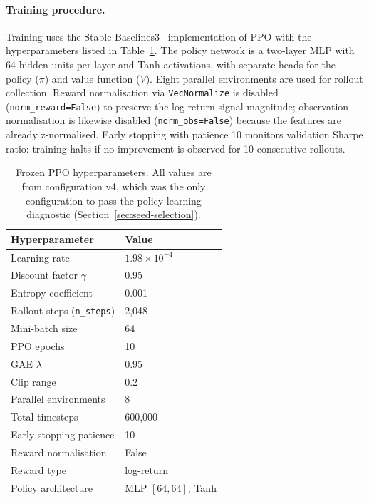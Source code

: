 \paragraph{Training procedure.}
Training uses the Stable-Baselines3~\cite{raffin2021stable}
implementation of PPO with the hyperparameters listed in
Table~\ref{tab:ppo-hyperparams}. The policy network is a two-layer MLP
with 64 hidden units per layer and Tanh activations, with separate heads
for the policy ($\pi$) and value function ($V$). Eight parallel
environments are used for rollout collection. Reward normalisation via
\texttt{VecNormalize} is disabled (\texttt{norm\_reward=False}) to
preserve the log-return signal magnitude; observation normalisation is
likewise disabled (\texttt{norm\_obs=False}) because the features are
already z-normalised. Early stopping with patience 10 monitors validation
Sharpe ratio: training halts if no improvement is observed for 10
consecutive rollouts.

\begin{table}[t]
\centering
\caption{Frozen PPO hyperparameters. All values are from configuration v4,
  which was the only configuration to pass the policy-learning diagnostic
  (Section~\ref{sec:seed-selection}).}
\label{tab:ppo-hyperparams}
\begin{tabular}{@{}ll@{}}
\toprule
\textbf{Hyperparameter} & \textbf{Value} \\
\midrule
Learning rate            & $1.98 \times 10^{-4}$ \\
Discount factor $\gamma$ & 0.95 \\
Entropy coefficient      & 0.001 \\
Rollout steps (\texttt{n\_steps})  & 2{,}048 \\
Mini-batch size          & 64 \\
PPO epochs               & 10 \\
GAE $\lambda$            & 0.95 \\
Clip range               & 0.2 \\
Parallel environments    & 8 \\
Total timesteps          & 600{,}000 \\
Early-stopping patience  & 10 \\
Reward normalisation     & False \\
Reward type              & log-return \\
Policy architecture      & MLP $[64, 64]$, Tanh \\
\bottomrule
\end{tabular}
\end{table}

